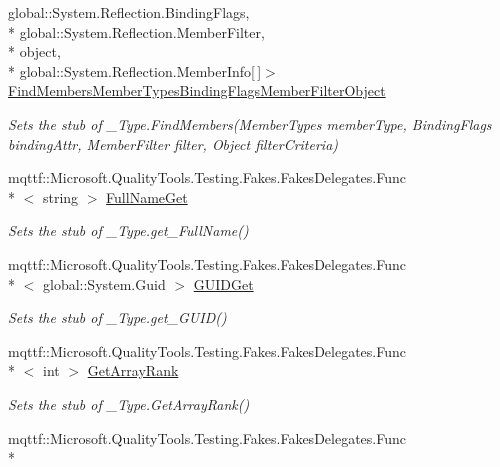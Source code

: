 \begin{DoxyCompactItemize}
global\-::\-System.\-Reflection.\-Binding\-Flags, \\*
global\-::\-System.\-Reflection.\-Member\-Filter, \\*
object, \\*
global\-::\-System.\-Reflection.\-Member\-Info\mbox{[}$\,$\mbox{]}$>$ \hyperlink{class_system_1_1_runtime_1_1_interop_services_1_1_fakes_1_1_stub___type_ad1a13a1a31db5b6db77dce4c8771c203}{Find\-Members\-Member\-Types\-Binding\-Flags\-Member\-Filter\-Object}
\begin{DoxyCompactList}\small\item\em Sets the stub of \-\_\-\-Type.\-Find\-Members(\-Member\-Types member\-Type, Binding\-Flags binding\-Attr, Member\-Filter filter, Object filter\-Criteria)\end{DoxyCompactList}\item 
mqttf\-::\-Microsoft.\-Quality\-Tools.\-Testing.\-Fakes.\-Fakes\-Delegates.\-Func\\*
$<$ string $>$ \hyperlink{class_system_1_1_runtime_1_1_interop_services_1_1_fakes_1_1_stub___type_ad73767aa4833946189ac4a66c8471f65}{Full\-Name\-Get}
\begin{DoxyCompactList}\small\item\em Sets the stub of \-\_\-\-Type.\-get\-\_\-\-Full\-Name()\end{DoxyCompactList}\item 
mqttf\-::\-Microsoft.\-Quality\-Tools.\-Testing.\-Fakes.\-Fakes\-Delegates.\-Func\\*
$<$ global\-::\-System.\-Guid $>$ \hyperlink{class_system_1_1_runtime_1_1_interop_services_1_1_fakes_1_1_stub___type_a9dc904eb53ffab922dd77ddde830c7d4}{G\-U\-I\-D\-Get}
\begin{DoxyCompactList}\small\item\em Sets the stub of \-\_\-\-Type.\-get\-\_\-\-G\-U\-I\-D()\end{DoxyCompactList}\item 
mqttf\-::\-Microsoft.\-Quality\-Tools.\-Testing.\-Fakes.\-Fakes\-Delegates.\-Func\\*
$<$ int $>$ \hyperlink{class_system_1_1_runtime_1_1_interop_services_1_1_fakes_1_1_stub___type_a6943017a4faae31c1fca18cfaf32c186}{Get\-Array\-Rank}
\begin{DoxyCompactList}\small\item\em Sets the stub of \-\_\-\-Type.\-Get\-Array\-Rank()\end{DoxyCompactList}\item 
mqttf\-::\-Microsoft.\-Quality\-Tools.\-Testing.\-Fakes.\-Fakes\-Delegates.\-Func\\*

\end{DoxyCompactItemize}
